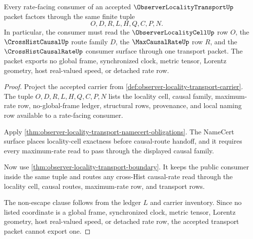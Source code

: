 \begin{theorem}
\label{thm:observer-locality-transport-rate-pullback}
Every rate-facing consumer of an accepted $\ObserverLocalityTransportUp$ packet factors through the same finite tuple
$$
O,D,R,L,H,Q,C,P,N.
$$
In particular, the consumer must read the $\ObserverLocalityCellUp$ row $O$, the $\CrossHistCausalUp$ route family $D$, the $\MaxCausalRateUp$ row $R$, and the $\CrossHistCausalRateUp$ consumer surface through one transport packet. The packet exports no global frame, synchronized clock, metric tensor, Lorentz geometry, host real-valued speed, or detached rate row.
\end{theorem}
\begin{proof}
Project the accepted carrier from \autoref{def:observer-locality-transport-carrier}. The tuple $O,D,R,L,H,Q,C,P,N$ lists the locality cell, causal family, maximum-rate row, no-global-frame ledger, structural rows, provenance, and local naming row available to a rate-facing consumer.

Apply \autoref{thm:observer-locality-transport-namecert-obligations}. The NameCert surface places locality-cell exactness before causal-route handoff, and it requires every maximum-rate read to pass through the displayed causal family.

Now use \autoref{thm:observer-locality-transport-boundary}. It keeps the public consumer inside the same tuple and routes any cross-Hist causal-rate read through the locality cell, causal routes, maximum-rate row, and transport rows.

The non-escape clause follows from the ledger $L$ and carrier inventory. Since no listed coordinate is a global frame, synchronized clock, metric tensor, Lorentz geometry, host real-valued speed, or detached rate row, the accepted transport packet cannot export one.
\end{proof}


